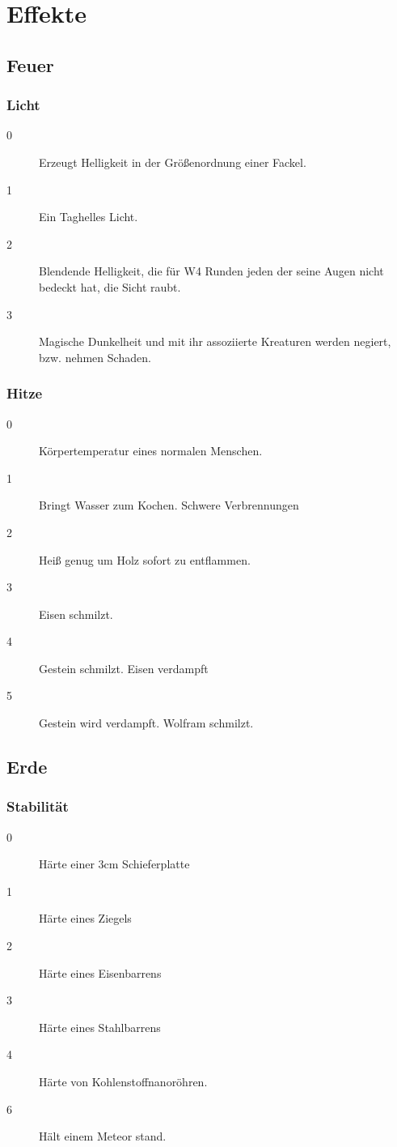 \documentclass[a4paper,12pt,oneside]{book}
\begin{document}
\part{Effekte}

\chapter{Feuer}
\section{Licht}
\begin{description}
\item[0] Erzeugt Helligkeit in der Größenordnung einer Fackel.
\item[1] Ein Taghelles Licht.
\item[2] Blendende Helligkeit, die für W4 Runden jeden der seine Augen nicht bedeckt hat, die Sicht raubt.
\item[3] Magische Dunkelheit und mit ihr assoziierte Kreaturen werden negiert, bzw. nehmen Schaden.     
\end{description}
\section{Hitze}
\begin{description}
\item[0] Körpertemperatur eines normalen Menschen.
\item[1] Bringt Wasser zum Kochen. Schwere Verbrennungen
\item[2] Heiß genug um Holz sofort zu entflammen.
\item[3] Eisen schmilzt.
\item[4] Gestein schmilzt. Eisen verdampft
\item[5] Gestein wird verdampft. Wolfram schmilzt.
\end{description}

\chapter{Erde}
\section{Stabilität}
\begin{description}
\item[0]Härte einer 3cm Schieferplatte
\item[1]Härte eines Ziegels
\item[2]Härte eines Eisenbarrens
\item[3]Härte eines Stahlbarrens
\item[4]Härte von Kohlenstoffnanoröhren.
\item[6]Hält einem Meteor stand.
\end{description}
\end{document}
